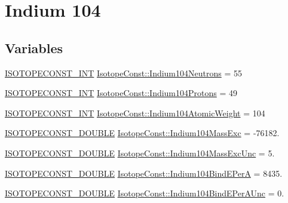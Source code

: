 \hypertarget{group___isotope_const-_indium-_in104}{}\section{Indium 104}
\label{group___isotope_const-_indium-_in104}
\subsection*{Variables}
\begin{DoxyCompactItemize}
\item 
\mbox{\hyperlink{group___isotope_const-_macros_ga5f18360b3e99483a35c32d789e62621c}{I\+S\+O\+T\+O\+P\+E\+C\+O\+N\+S\+T\+\_\+\+I\+NT}} \mbox{\hyperlink{group___isotope_const-_indium-_in104_ga67d29549117b51b86f38c4aff9fb7865}{Isotope\+Const\+::\+Indium104\+Neutrons}} = 55
\item 
\mbox{\hyperlink{group___isotope_const-_macros_ga5f18360b3e99483a35c32d789e62621c}{I\+S\+O\+T\+O\+P\+E\+C\+O\+N\+S\+T\+\_\+\+I\+NT}} \mbox{\hyperlink{group___isotope_const-_indium-_in104_gacdd6667207c5d16a90cf0033566c947c}{Isotope\+Const\+::\+Indium104\+Protons}} = 49
\item 
\mbox{\hyperlink{group___isotope_const-_macros_ga5f18360b3e99483a35c32d789e62621c}{I\+S\+O\+T\+O\+P\+E\+C\+O\+N\+S\+T\+\_\+\+I\+NT}} \mbox{\hyperlink{group___isotope_const-_indium-_in104_ga676ee40b5891e26c522fc0e9dc1ee539}{Isotope\+Const\+::\+Indium104\+Atomic\+Weight}} = 104
\item 
\mbox{\hyperlink{group___isotope_const-_macros_ga8f45a7272ce02c0b4c65c44636ed719a}{I\+S\+O\+T\+O\+P\+E\+C\+O\+N\+S\+T\+\_\+\+D\+O\+U\+B\+LE}} \mbox{\hyperlink{group___isotope_const-_indium-_in104_ga262fc378358ec083a159dac83b985b1d}{Isotope\+Const\+::\+Indium104\+Mass\+Exc}} = -\/76182.
\item 
\mbox{\hyperlink{group___isotope_const-_macros_ga8f45a7272ce02c0b4c65c44636ed719a}{I\+S\+O\+T\+O\+P\+E\+C\+O\+N\+S\+T\+\_\+\+D\+O\+U\+B\+LE}} \mbox{\hyperlink{group___isotope_const-_indium-_in104_ga6f5063b7fb4cc7876c79abe324458187}{Isotope\+Const\+::\+Indium104\+Mass\+Exc\+Unc}} = 5.
\item 
\mbox{\hyperlink{group___isotope_const-_macros_ga8f45a7272ce02c0b4c65c44636ed719a}{I\+S\+O\+T\+O\+P\+E\+C\+O\+N\+S\+T\+\_\+\+D\+O\+U\+B\+LE}} \mbox{\hyperlink{group___isotope_const-_indium-_in104_ga0b40476ffa59cae6be146df5ec3d7a75}{Isotope\+Const\+::\+Indium104\+Bind\+E\+PerA}} = 8435.
\item 
\mbox{\hyperlink{group___isotope_const-_macros_ga8f45a7272ce02c0b4c65c44636ed719a}{I\+S\+O\+T\+O\+P\+E\+C\+O\+N\+S\+T\+\_\+\+D\+O\+U\+B\+LE}} \mbox{\hyperlink{group___isotope_const-_indium-_in104_ga598143dd4b0408eb099b96c36f3cd114}{Isotope\+Const\+::\+Indium104\+Bind\+E\+Per\+A\+Unc}} = 0.

\end{DoxyCompactItemize}
